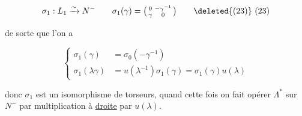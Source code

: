 \[
\sigma_1:L_1\xrightarrow{\sim}N^-\qquad \sigma_1(\gamma)=\bigl(\begin{smallmatrix}0&-\gamma^{-1}\\\gamma&0\end{smallmatrix}\bigr)\tag*{\deleted{(23)} (23)}
\]

de sorte que l'on a

\[
\left\{\begin{aligned}
 \sigma_1(\gamma)&=\sigma_0(-\gamma^{-1})\\
 \sigma_1(\lambda\gamma)&=u(\lambda^{-1})\sigma_1(\gamma)=\sigma_1(\gamma)u(\lambda)
\end{aligned}\right.\tag*{(24)}
\]

donc $\sigma_1$ est un isomorphisme de \inserted{$\Lambda^*$-}torseurs, quand cette fois on fait opérer $\Lambda^*$ sur $N^-$ par multiplication à \uline{droite} par $u(\lambda)$.

